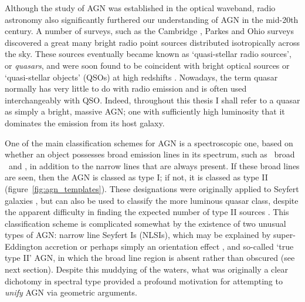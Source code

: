 Although the study of AGN was established in the optical waveband, 
radio astronomy also significantly furthered our understanding of AGN
in the mid-20th century. A number of surveys, such as the Cambridge \citep{edge1959}, 
Parkes \citep{ekers1969} and Ohio \citep{ehman1970} surveys discovered a great many 
bright radio point sources distributed isotropically across the sky.
These sources eventually became known as `quasi-stellar radio sources',
or {\em quasars}, and were soon found to be coincident with bright optical
sources or `quasi-stellar objects' (QSOs) at high 
redshifts \citep{schmidt1963,schmidt1965a,schmidt1965b}.
Nowadays, the term quasar normally has very little to do with 
radio emission and is often used interchangeably with QSO. 
Indeed, throughout this thesis I shall refer to a quasar as simply a bright, 
massive AGN; one with sufficiently high luminosity that it dominates the emission 
from its host galaxy.

One of the main classification schemes for AGN is a spectroscopic one, based on 
whether an object possesses broad emission lines in its spectrum, 
such as \civ\, broad \hb\ and
\la, in addition to the narrow lines that are always present. 
If these broad lines are seen, then the AGN is classed as type I;
if not, it is classed as type II (figure~\ref{fig:agn_templates}).
These designations were originally applied to Seyfert galaxies \citep{seyfert1943}, 
but can also be used to classify the more luminous quasar class, despite the apparent
difficulty in finding the expected number of type II sources \citep{zakamska2003}. 
This classification scheme is complicated somewhat by the existence of two
unusual types of AGN: narrow line Seyfert Is (NLSIs), which
may be explained by super-Eddington accretion \citep{done2015} 
or perhaps simply an orientation effect \citep{baldi2016},
and so-called `true type II' AGN, in which the broad line region is absent 
\citep{tran2001,shi2010} rather than obscured (see next section).
Despite this muddying of the waters, what was originally a 
clear dichotomy in spectral type provided a 
profound motivation for attempting to {\em unify} AGN via geometric arguments.




